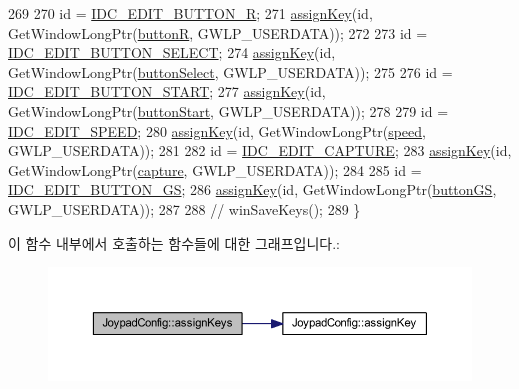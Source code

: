 \begin{DoxyCode}
269 
270   \textcolor{keywordtype}{id} = \mbox{\hyperlink{resource_8h_aca900b079421856c84c22696e0054cf1}{IDC\_EDIT\_BUTTON\_R}};
271   \mbox{\hyperlink{class_joypad_config_a6fe836465dc6d861d96691c03ad0a636}{assignKey}}(\textcolor{keywordtype}{id}, GetWindowLongPtr(\mbox{\hyperlink{class_joypad_config_ae8492d5da1c116da58dbaecc7572576b}{buttonR}}, GWLP\_USERDATA));
272   
273   \textcolor{keywordtype}{id} = \mbox{\hyperlink{resource_8h_ac8953535a0ab3293fa3ae6aa107a6420}{IDC\_EDIT\_BUTTON\_SELECT}};
274   \mbox{\hyperlink{class_joypad_config_a6fe836465dc6d861d96691c03ad0a636}{assignKey}}(\textcolor{keywordtype}{id}, GetWindowLongPtr(\mbox{\hyperlink{class_joypad_config_a79baa8f4d47b02dde3f032961e239556}{buttonSelect}}, GWLP\_USERDATA));
275 
276   \textcolor{keywordtype}{id} = \mbox{\hyperlink{resource_8h_a5db9e5ab3107d96db0fce4a54498232f}{IDC\_EDIT\_BUTTON\_START}};
277   \mbox{\hyperlink{class_joypad_config_a6fe836465dc6d861d96691c03ad0a636}{assignKey}}(\textcolor{keywordtype}{id}, GetWindowLongPtr(\mbox{\hyperlink{class_joypad_config_a9083bf057d36c0fd78fe1976bee9fb74}{buttonStart}}, GWLP\_USERDATA));
278 
279   \textcolor{keywordtype}{id} = \mbox{\hyperlink{resource_8h_a59a53c2540f84ff9094d9bfa68d22697}{IDC\_EDIT\_SPEED}};
280   \mbox{\hyperlink{class_joypad_config_a6fe836465dc6d861d96691c03ad0a636}{assignKey}}(\textcolor{keywordtype}{id}, GetWindowLongPtr(\mbox{\hyperlink{class_joypad_config_a57365c2b56d24e6cf20d3586d692583d}{speed}}, GWLP\_USERDATA));
281 
282   \textcolor{keywordtype}{id} = \mbox{\hyperlink{resource_8h_a9537127d26017dca3680b51458b4963b}{IDC\_EDIT\_CAPTURE}};
283   \mbox{\hyperlink{class_joypad_config_a6fe836465dc6d861d96691c03ad0a636}{assignKey}}(\textcolor{keywordtype}{id}, GetWindowLongPtr(\mbox{\hyperlink{class_joypad_config_a82881a0174178e60d0a60a2b574fd385}{capture}}, GWLP\_USERDATA));
284 
285   \textcolor{keywordtype}{id} = \mbox{\hyperlink{resource_8h_a622904a3fc8c117ae7e4c735a0506738}{IDC\_EDIT\_BUTTON\_GS}};
286   \mbox{\hyperlink{class_joypad_config_a6fe836465dc6d861d96691c03ad0a636}{assignKey}}(\textcolor{keywordtype}{id}, GetWindowLongPtr(\mbox{\hyperlink{class_joypad_config_a4aa48681f17e03adced442271f29211f}{buttonGS}}, GWLP\_USERDATA));
287 
288   \textcolor{comment}{//  winSaveKeys();}
289 \}
\end{DoxyCode}
이 함수 내부에서 호출하는 함수들에 대한 그래프입니다.\+:
\nopagebreak
\begin{figure}[H]
\begin{center}
\leavevmode
\includegraphics[width=350pt]{class_joypad_config_a37ced249f71ab247733787e07085e295_cgraph}
\end{center}
\end{figure}
